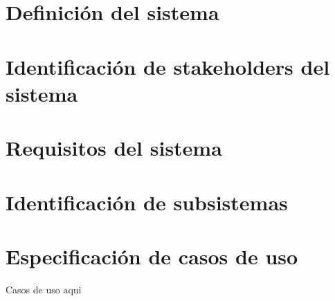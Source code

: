 \section{Definición del sistema}
\label{definicion_sistema}



\section{Identificación de stakeholders del sistema}
\label{identificacion_stakeholders}



\section{Requisitos del sistema}
\label{requisitos_sistema}



\section{Identificación de subsistemas}
\label{identificacion_subsistemas}



\section{Especificación de casos de uso}
Casos de uso aqui